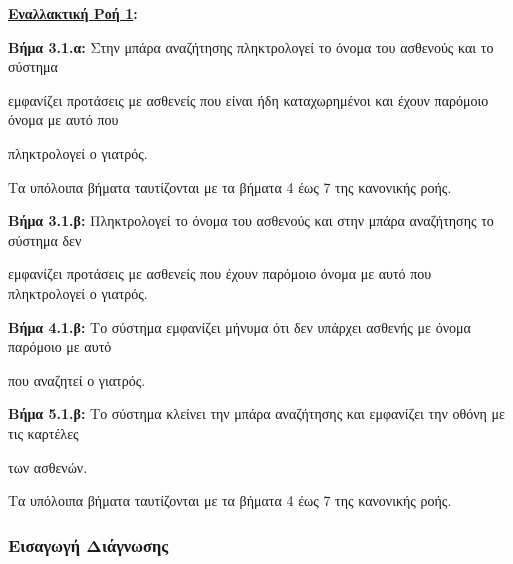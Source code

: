 \documentclass{article}
\begin{document}
\textbf{\underline{Εναλλακτική Ροή 1}:} \vspace{0.2cm}
\par \textbf{Βήμα 3.1.α:} Στην μπάρα αναζήτησης πληκτρολογεί το όνομα του ασθενούς και το σύστημα \par εμφανίζει προτάσεις με ασθενείς που είναι ήδη καταχωρημένοι και έχουν παρόμοιο όνομα με αυτό που \par πληκτρολογεί ο γιατρός.\vspace{0.1cm} 
\par Τα υπόλοιπα βήματα ταυτίζονται με τα βήματα 4 έως 7 της κανονικής ροής.

\vspace{0.2cm}

\par \textbf{Βήμα 3.1.β:}  Πληκτρολογεί το όνομα του ασθενούς και στην μπάρα αναζήτησης το σύστημα δεν \par εμφανίζει προτάσεις με ασθενείς που έχουν παρόμοιο όνομα με αυτό που πληκτρολογεί ο γιατρός. \vspace{0.1cm}
\par \textbf{Βήμα 4.1.β:} Το σύστημα εμφανίζει μήνυμα ότι δεν υπάρχει ασθενής με όνομα παρόμοιο με αυτό \par που αναζητεί ο γιατρός. \vspace{0.1cm}
\par \textbf{Βήμα 5.1.β:} Το σύστημα κλείνει την μπάρα αναζήτησης και εμφανίζει την οθόνη με τις καρτέλες \par των ασθενών. \vspace{0.1cm}

\par Τα υπόλοιπα βήματα ταυτίζονται με τα βήματα 4 έως 7 της κανονικής ροής. 

\newpage

\subsubsection{Εισαγωγή Διάγνωσης}
 
\end{document}

